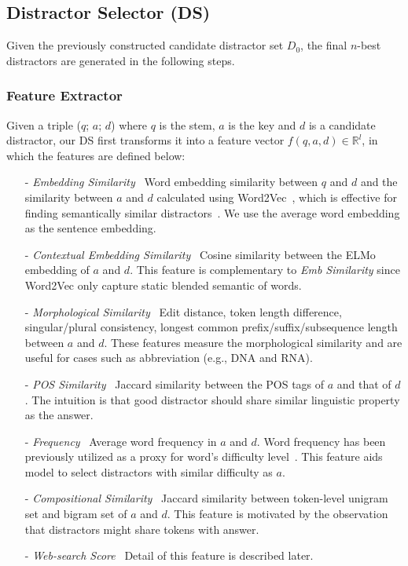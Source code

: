 \subsection{Distractor Selector (DS)}
\label{sec:DS}
Given the previously constructed candidate distractor set $D_0$, the final $n$-best distractors are generated in the following steps.
\subsubsection{Feature Extractor}
\label{sec:FE}
Given a triple ($q$; $a$; $d$) where $q$ is the stem, $a$ is the key and $d$ is a candidate distractor, 
our DS first transforms it into a feature vector $f(q,a,d)\in \mathbb{R}^l$, in which the features are defined below:
\begin{itemize}
	\item[-] \textit{Embedding Similarity} ~Word embedding similarity between $q$ and $d$ and the similarity between $a$ and $d$ calculated using Word2Vec~\cite{mikolov2013distributed}, which is effective for finding semantically similar distractors~\cite{guo2016questimator}. We use the average word embedding as the sentence embedding. 
	\item[-] \textit{Contextual Embedding Similarity} ~Cosine similarity between the ELMo~\cite{peters2018deep} embedding of $a$ and $d$. This feature is complementary to \textit{Emb Similarity} since Word2Vec only capture static blended semantic of words. 
	\item[-] \textit{Morphological Similarity} ~Edit distance, token length difference, singular/plural consistency, longest common prefix/suffix/subsequence length between $a$ and $d$. These features measure the morphological similarity and are useful for cases such as abbreviation 
(e.g., DNA and RNA). 
	\item[-] \textit{POS Similarity} ~Jaccard similarity between the 
POS tags of $a$ and that of $d$. The intuition is that good distractor 
should share similar linguistic property as the answer.
	\item[-] \textit{Frequency} ~Average word frequency in $a$ and $d$. Word frequency has been previously utilized as a proxy for word's difficulty level~\cite{article}. This feature aids model to select distractors with similar difficulty as $a$.
	\item[-] \textit{Compositional Similarity} ~Jaccard similarity between token-level
unigram set and bigram set of $a$ and $d$. This feature is motivated 
by the observation that distractors might share tokens with answer.
	\item[-] \textit{Web-search Score} ~Detail of this feature is described later.
\end{itemize} 

